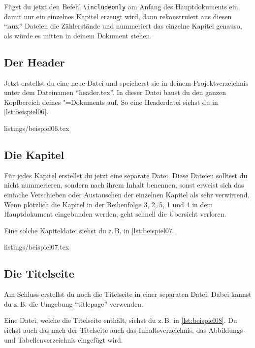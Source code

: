 Fügst du jetzt den Befehl \texttt{\textbackslash includeonly} am Anfang des Hauptdokuments ein, damit nur ein einzelnes Kapitel erzeugt wird, dann rekonstruiert \DMLLaTeX{} aus diesen \enquote{.aux} Dateien die Zählerstände und nummeriert das einzelne Kapitel genauso, als würde es mitten in deinem Dokument stehen.

\subsection{Der Header}

Jetzt erstellst du eine neue Datei und speicherst sie in deinem Projektverzeichnis unter dem Dateinamen \enquote{header.tex}. In dieser Datei baust du den ganzen Kopfbereich deines \DMLLaTeX"=Dokuments auf. So eine Headerdatei siehst du in \cref{lst:beispiel06}.

%
	{listings/beispiel06.tex}

\subsection{Die Kapitel}

Für jedes Kapitel erstellst du jetzt eine separate Datei. Diese Dateien solltest du nicht nummerieren, sondern nach ihrem Inhalt benennen, sonst erweist sich das einfache Verschieben oder Austauschen der einzelnen Kapitel als sehr verwirrend. Wenn plötzlich die Kapitel in der Reihenfolge 3, 2, 5, 1 und 4 in dem Hauptdokument eingebunden werden, geht schnell die Übersicht verloren.

Eine solche Kapiteldatei siehst du z.\,B. in \cref{lst:beispiel07}

%
	{listings/beispiel07.tex}

\subsection{Die Titelseite}

Am Schluss erstellst du noch die Titelseite in einer separaten Datei. Dabei kannst du z.\,B. die Umgebung \enquote{titlepage} verwenden.

Eine Datei, welche die Titelseite enthält, siehst du z.\,B. in \cref{lst:beispiel08}. Du siehst auch das nach der Titelseite auch das Inhaltsverzeichnis, das Abbildungs- und Tabellenverzeichnis eingefügt wird.

